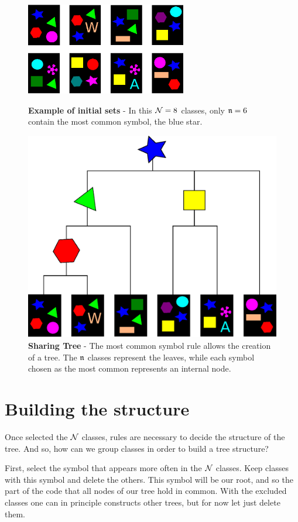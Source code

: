 \begin{figure}[p]%
\center
\includegraphics[width=7cm,draft=false]{images/sequenze.eps}
\caption{\label{Sequenza} \footnotesize\textbf{Example of initial sets} - In this $\mathcal N=8$ classes, only $\mathfrak n=6$ contain the most common symbol, the blue star.}
\vspace{2cm}
\includegraphics[width=\textwidth,draft=false]{images/sharingtree.eps}
\caption{\label{Albero} \footnotesize\textbf{Sharing Tree} - The most common symbol rule allows the creation of a tree. The $\mathfrak n$ classes represent the leaves, while each symbol chosen as the most common represents an internal node.}
\end{figure}

\section{Building the structure}
Once selected the $\mathcal N$ classes, rules are necessary to decide the structure of the tree. And so, how can we group classes in order to build a tree structure?

First, select the symbol that appears more often in the $\mathcal N$ classes. Keep classes with this symbol and delete the others. This symbol will be our root, and so the part of the code that all nodes of our tree hold in common. With the excluded classes one can in principle constructs other trees, but for now let just delete them.

